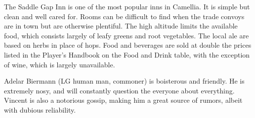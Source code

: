 The Saddle Gap Inn is one of the most popular inns in Camellia.
It is simple but clean and well cared for.
Rooms can be difficult to find when the trade convoys are in town but are otherwise plentiful.
The high altitude limits the available food, which consists largely of leafy greens and root vegetables.
The local ale are based on herbs in place of hops.
Food and beverages are sold at double the prices listed in the Player's Handbook on the Food and Drink table, with the exception of wine, which is largely unavailable.

Adelar Biermann (LG human man, commoner) is boisterous and friendly.
He is extremely nosy, and will constantly question the everyone about everything.
Vincent is also a notorious gossip, making him a great source of rumors, albeit with dubious reliability.
